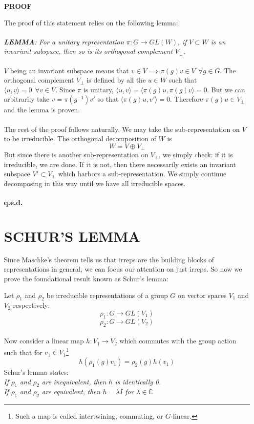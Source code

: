 \documentclass[9 pt]{report}
\begin{document}
\begin{center}
	\textbf{PROOF}
\end{center}
The proof of this statement relies on the following lemma:
\\
\\
\textit{\textbf{LEMMA}: For a unitary representation $\pi:G\to GL(W)$, if $V\subset W$ is an invariant subspace, then so is its orthogonal complement $V_\perp$.}
\\
\\
$V$ being an invariant subspace means that $v\in V \implies \pi(g)v\in V \:\:\forall g\in G$. The orthogonal complement $V_\perp$ is defined by all the $u \in W$ such that $\langle u,v \rangle=0 \:\: \forall v\in V$. Since $\pi$ is unitary, $\langle u, v\rangle = \langle\pi(g)u , \pi(g)v\rangle = 0$. But we can arbitrarily take $v=\pi(g^{-1})v'$ so that $\langle \pi(g)u, v'\rangle=0$. Therefore $\pi(g)u \in V_\perp$ and the lemma is proven.
\\
\\
The rest of the proof follows naturally. We may take the sub-representation on $V$ to be irreducible. The orthogonal decomposition of $W$ is
$$ W = V \oplus V_\perp $$
But since there is another sub-representation on $V_\perp$, we simply check: if it is irreducible, we are done. If it is not, then there necessarily exists an invariant subspace $V'\subset V_\perp$ which harbors a sub-representation. We simply continue decomposing in this way until we have all irreducible spaces.
\\
\\
\textbf{q.e.d.}



\pagebreak


 {\centering
\section*{SCHUR'S LEMMA}}
Since Maschke's theorem tells us that irreps are the building blocks of representations in general, we can focus our attention on just irreps. So now we prove the foundational result known as Schur's lemma: 

\begin{tcolorbox}
Let $\rho_1$ and $\rho_2$ be irreducible representations of a group $G$ on vector spaces $V_1$ and $V_2$ respectively:
$$ \rho_1 : G\rightarrow GL(V_1) $$
$$ \rho_2 : G \rightarrow GL(V_2) $$
\\
Now consider a linear map $h: V_1\rightarrow V_2$ which commutes with the group action such that for $v_1\in V_1$\footnote{Such a map is called intertwining, commuting, or $G$-linear.}
$$ h(\rho_1(g)v_1) = \rho_2(g)h(v_1) $$
Schur's lemma states:
\\
\textit{
If $\rho_1 $ and $\rho_2$ are inequivalent, then $h$ is identically 0.
\\
If $\rho_1$ and $\rho_2$ are equivalent, then $h=\lambda I$ for $\lambda \in \mathbb{C}$
}
\end{tcolorbox}
\end{document}
